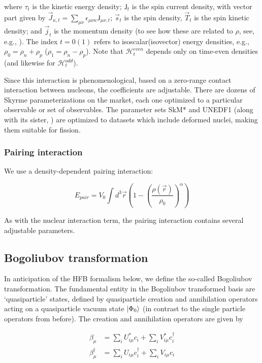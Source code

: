 \noindent where $\tau_t$ is the kinetic energy density; $\mathsf{J}_t$ is the spin current density, with vector part given by $\vec{J}_{\kappa,t} = \sum_{\mu\nu}\epsilon_{\mu\nu\kappa}\mathsf{J}_{\mu\nu,t}$; $\vec{s}_t$ is the spin density, $\vec{T}_t$ is the spin kinetic density; and $\vec{j}_t$ is the momentum density (to see how these are related to $\rho$, see, e.g., \cite{Bender2003}). The index $t=0(1)$ refers to isoscalar(isovector) energy densities, e.g., $\rho_0 = \rho_n + \rho_p$ ($\rho_1 = \rho_n - \rho_p$). Note that $\mathcal{H}^{even}_t$ depends only on time-even densities (and likewise for $\mathcal{H}^{odd}_t$).

Since this interaction is phenomenological, based on a zero-range contact interaction between nucleons, the coefficients are adjustable. There are dozens of Skyrme parameterizations on the market, each one optimized to a particular observable or set of observables. The parameter sets SkM* \cite{Bartel1982} and UNEDF1 \cite{Kortelainen2012} (along with its sister, {\hfb} \cite{Schunck2015}) are optimized to datasets which include deformed nuclei, making them suitable for fission.

\subsubsection{Pairing interaction}
We use a density-dependent pairing interaction:

\begin{equation}
E_{pair} = V_0 \int d^3\vec{r} \left( 1-\left(\frac{\rho(\vec{r})}{\rho_0}\right)^\alpha \right)
\end{equation}

\noindent As with the nuclear interaction term, the pairing interaction contains several adjustable parameters.

\subsection{Bogoliubov transformation}

In anticipation of the HFB formalism below, we define the so-called Bogoliubov transformation. The fundamental entity in the Bogoliubov transformed basis are `quasiparticle' states, defined by quasiparticle creation and annihilation operators acting on a quasiparticle vacuum state $\ket{\Phi_0}$ (in contrast to the single particle operators from before). The creation and annihilation operators are given by

\begin{align}
\beta_\mu &= \sum_i U^*_{i\mu}c_i + \sum_i V^*_{i\mu}c_i^\dagger \\
\beta_\mu^\dagger &= \sum_i U_{i\mu}c_i^\dagger + \sum_i V_{i\mu}c_i
\end{align}

